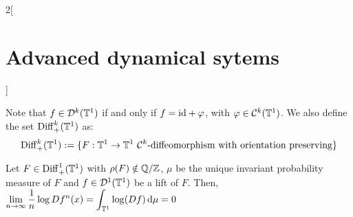 \documentclass[../../../main_math.tex]{subfiles}
\begin{document}
\begin{multicols}{2}[\section{Advanced dynamical sytems}]
\begin{definition}
$$    $$
    Note that $f\in \mathcal{D}^k(\mathbb{T}^1)$ if and only if $f=\mathrm{id} +\varphi$, with $\varphi\in\mathcal{C}^k(\mathbb{T}^1)$.
    We also define the set $\mathrm{Diff}_+^k(\mathbb{T}^1)$ as:
    $$
      \mathrm{Diff}_+^k(\mathbb{T}^1):=\{F:\mathbb{T}^1\to\mathbb{T}^1 \text{ $\mathcal{C}^k$-diffeomorphism with orientation preserving}\}
    $$
  \end{definition}
  \begin{proposition}
    Let $F\in\mathrm{Diff}_+^1(\mathbb{T}^1)$ with $\rho(F)\notin\quot{\QQ}{\ZZ}$, $\mu$ be the unique invariant probability measure of $F$ and $f\in\mathcal{D}^1(\mathbb{T}^1)$ be a lift of $F$. Then, $\displaystyle \lim_{n\to \infty}\frac{1}{n}\log Df^n(x)=\int_{\mathbb{T}^1}\log(Df)\dd{\mu}=0$
  \end{proposition}
\end{multicols}
\end{document}
